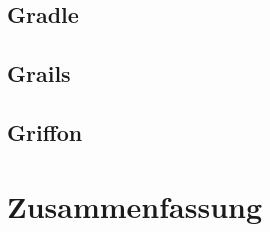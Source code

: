 	\subsection{Gradle}\label{subsec:gradle}

	\subsection{Grails}\label{subsec:grails}

	\subsection{Griffon}\label{subsec:griffon}


	\section{Zusammenfassung}\label{sec:zusammenfassung}


	
	


